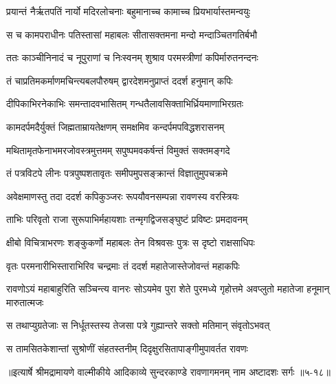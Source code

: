 \twolineshloka
{प्रयान्तं नैर्ऋतपतिं नार्यो मदिरलोचनाः}
{बहुमानाच्च कामाच्च प्रियभार्यास्तमन्वयुः} %

\twolineshloka
{स च कामपराधीनः पतिस्तासां महाबलः}
{सीतासक्तमना मन्दो मन्दाञ्चितगतिर्बभौ} %

\twolineshloka
{ततः काञ्चीनिनादं च नूपुराणां च निःस्वनम्}
{शुश्राव परमस्त्रीणां कपिर्मारुतनन्दनः} %

\twolineshloka
{तं चाप्रतिमकर्माणमचिन्त्यबलपौरुषम्}
{द्वारदेशमनुप्राप्तं ददर्श हनुमान् कपिः} %

\twolineshloka
{दीपिकाभिरनेकाभिः समन्तादवभासितम्}
{गन्धतैलावसिक्ताभिर्ध्रियमाणाभिरग्रतः} %

\twolineshloka
{कामदर्पमदैर्युक्तं जिह्मताम्रायतेक्षणम्}
{समक्षमिव कन्दर्पमपविद्धशरासनम्} %

\twolineshloka
{मथितामृतफेनाभमरजोवस्त्रमुत्तमम्}
{सपुष्पमवकर्षन्तं विमुक्तं सक्तमङ्गदे} %

\twolineshloka
{तं पत्रविटपे लीनः पत्रपुष्पशतावृतः}
{समीपमुपसङ्क्रान्तं विज्ञातुमुपचक्रमे} %

\twolineshloka
{अवेक्षमाणस्तु तदा ददर्श कपिकुञ्जरः}
{रूपयौवनसम्पन्ना रावणस्य वरस्त्रियः} %

\twolineshloka
{ताभिः परिवृतो राजा सुरूपाभिर्महायशाः}
{तन्मृगद्विजसङ्घुष्टं प्रविष्टः प्रमदावनम्} %

\twolineshloka
{क्षीबो विचित्राभरणः शङ्कुकर्णो महाबलः}
{तेन विश्रवसः पुत्रः स दृष्टो राक्षसाधिपः} %

\twolineshloka
{वृतः परमनारीभिस्ताराभिरिव चन्द्रमाः}
{तं ददर्श महातेजास्तेजोवन्तं महाकपिः} %

\threelineshloka
{रावणोऽयं महाबाहुरिति सञ्चिन्त्य वानरः}
{सोऽयमेव पुरा शेते पुरमध्ये गृहोत्तमे}
{अवप्लुतो महातेजा हनूमान् मारुतात्मजः} %

\twolineshloka
{स तथाप्युग्रतेजाः स निर्धूतस्तस्य तेजसा}
{पत्रे गुह्यान्तरे सक्तो मतिमान् संवृतोऽभवत्} %

\twolineshloka
{स तामसितकेशान्तां सुश्रोणीं संहतस्तनीम्}
{दिदृक्षुरसितापाङ्गीमुपावर्तत रावणः} %


॥इत्यार्षे श्रीमद्रामायणे वाल्मीकीये आदिकाव्ये सुन्दरकाण्डे रावणागमनम् नाम अष्टादशः सर्गः ॥५-१८॥
